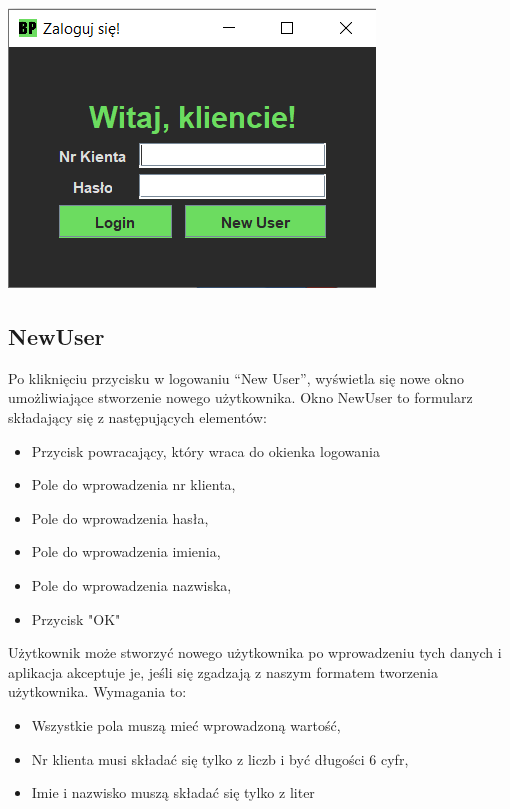 \documentclass[12pt, letterpaper]{article}
\begin{document}
\begin{center}
	\includegraphics[scale=0.8]{login}
\end{center}

\newpage

\subsection{NewUser}
\quad Po kliknięciu przycisku w logowaniu “New User”, wyświetla się nowe okno umożliwiające stworzenie nowego użytkownika.
Okno NewUser to formularz składający się z następujących elementów: 

\begin{itemize}
\item Przycisk powracający, który wraca do okienka logowania
\item Pole do wprowadzenia nr klienta,
\item Pole do wprowadzenia hasła,
\item Pole do wprowadzenia imienia,
\item Pole do wprowadzenia nazwiska,
\item Przycisk "OK"
\end{itemize}

\quad Użytkownik może stworzyć nowego użytkownika po wprowadzeniu tych danych i aplikacja akceptuje je, jeśli się zgadzają z naszym formatem tworzenia użytkownika. Wymagania to:

\begin{itemize}
\item Wszystkie pola muszą mieć wprowadzoną wartość,
\item Nr klienta musi składać się tylko z liczb i być długości 6 cyfr,
\item Imie i nazwisko muszą składać się tylko z liter
\end{itemize}
\end{document}
